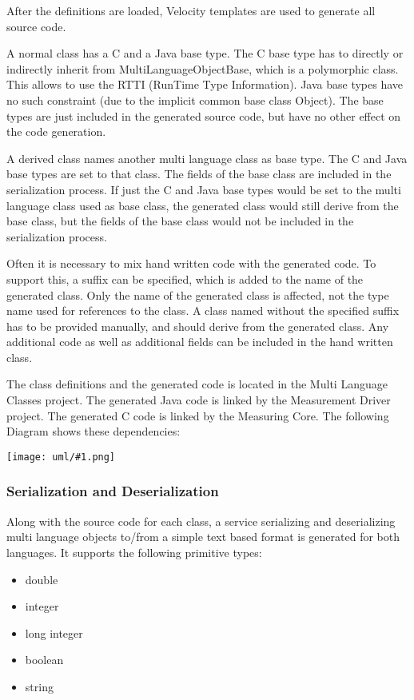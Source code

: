 \documentclass[a4paper,12pt]{article}
\newcommand{\umlDiagram}[1]{\begin{center}\texttt{[image: uml/\#1.png]}\end{center}}
\begin{document}
After the definitions are loaded, Velocity templates are used to generate all source code.

A normal class has a C and a Java base type. The C base type has to directly or indirectly inherit from MultiLanguageObjectBase, which is a polymorphic class. This allows to use the RTTI (RunTime Type Information). Java base types have no such constraint (due to the implicit common base class Object). The base types are just included in the generated source code, but have no other effect on the code generation.

A derived class names another multi language class as base type. The C and Java base types are set to that class. The fields of the base class are included in the serialization process. If just the C and Java base types would be set to the multi language class used as base class, the generated class would still derive from the base class, but the fields of the base class would not be included in the serialization process.

Often it is necessary to mix hand written code with the generated code. To support this, a suffix can be specified, which is added to the name of the generated class. Only the name of the generated class is affected, not the type name used for references to the class. A class named without the specified suffix has to be provided manually, and should derive from the generated class. Any additional code as well as additional fields can be included in the hand written class.

The class definitions and the generated code is located in the Multi Language Classes project. The generated Java code is linked by the Measurement Driver project. The generated C code is linked by the Measuring Core. The following Diagram shows these dependencies:

\umlDiagram{CodeGenerationDependencies}

\subsubsection{Serialization and Deserialization}
Along with the source code for each class, a service serializing and deserializing multi language objects to/from a simple text based format is generated for both languages. It supports the following primitive types:
\begin{itemize}
\item double
\item integer
\item long integer
\item boolean
\item string
\end{itemize}
\end{document}
